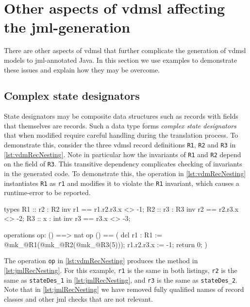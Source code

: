 \section{Other aspects of \ac{vdmsl} affecting the
\ac{jml}-generation}
\label{sec:sl-other-gen}

There are other aspects of \ac{vdmsl} that further complicate the
generation of \ac{vdmsl} models to \ac{jml}-annotated Java. In this
section we use examples to demonstrate these issues and explain how
they may be overcome.

\subsection{Complex state designators}
\label{sub:complex-state}

State designators may be composite data structures such as records
with fields that themselves are records. Such a data type forms
\emph{complex state designators} that when modified require careful
handling during the translation process. To demonstrate this, consider
the three \ac{vdmsl} record definitions \texttt{R1}, \texttt{R2} and
\texttt{R3} in \autoref{lst:vdmRecNesting}. Note in particular how the
invariants of \texttt{R1} and \texttt{R2} depend on the field of
\texttt{R3}. This transitive dependency complicates checking of
invariants in the generated code. To demonstrate this, the operation
in \autoref{lst:vdmRecNesting} instantiates \texttt{R1} as \texttt{r1}
and modifies it to violate the \texttt{R1} invariant, which causes a
runtime-error to be reported.

\begin{vdmsl}[style=customVdm,caption={Record nesting in
\ac{vdmsl}.},label={lst:vdmRecNesting}]
types
R1 :: r2 : R2
inv r1 == r1.r2.r3.x <> -1;
R2 :: r3 : R3
inv r2 == r2.r3.x <> -2;
R3 :: x : int
inv r3 == r3.x <> -3;

operations
op: () ==> nat
op () ==
(
 dcl r1 : R1 := @mk_@R1(@mk_@R2(@mk_@R3(5)));
 r1.r2.r3.x := -1;
 return 0;
)
\end{vdmsl}

The operation \texttt{op} in \autoref{lst:vdmRecNesting} produces the
method in \autoref{lst:jmlRecNesting}. For this example, \texttt{r1}
is the same in both listings, \texttt{r2} is the same as
\texttt{stateDes\_1} in \autoref{lst:jmlRecNesting}, and \texttt{r3}
is the same as \texttt{stateDes\_2}. Note that in
\autoref{lst:jmlRecNesting} we have removed fully qualified names of
record classes and other \ac{jml} checks that are not relevant.

